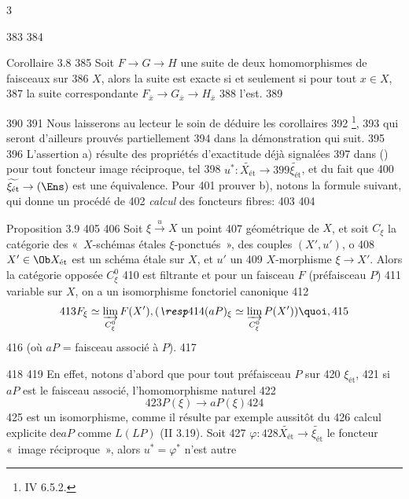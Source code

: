 3	\documentclass[10pt]{../fichiers-configuration-latex/smfart}
\begin{document}
   383	
   384	\begin{enonce*}{Corollaire 3.8}
   385	Soit $F \to G \to H$ une suite de deux homomorphismes de faisceaux sur
   386	$X$, alors la suite est exacte si et seulement si pour tout $x \in X$,
   387	la suite correspondante $F_{\bar{x}} \to G_{\bar{x}} \to H_{\bar{x}}$
   388	l'est.
   389	\end{enonce*}
   390	
   391	Nous laisserons au lecteur le soin de déduire les corollaires
   392	\footnote{\Cf IV 6.5.2.}, %
   393	qui seront d'ailleurs prouvés partiellement
   394	dans la démonstration qui suit.
   395	
   396	L'assertion a) résulte des propriétés d'exactitude déjà signalées
   397	dans () pour tout foncteur image réciproque, tel
   398	$u^{\ast} : \widetilde{X_{\text{ét}}} \to
   399	\widetilde{\xi_{\text{ét}}}$, et du fait que
   400	$\widetilde{\xi_{\text{ét}}} \to (\Ens)$ est une équivalence. Pour
   401	prouver b), notons la formule suivant, qui donne un procédé de
   402	\emph{calcul} des foncteurs fibres:
   403	
   404	\begin{enonce*}{Proposition 3.9\footnotemark}
   405	 %
   406	Soit $\xi \xrightarrow{u} X$ un point
   407	géométrique de $X$, et soit $C_{\xi}$ la catégorie des « $X$-schémas étales $\xi$-ponctués », \ie des couples $(X', u')$, o
   408	$X'\in \Ob X_{\text{\rm ét}}$ est un schéma étale sur $X$, et $u'$ un
   409	$X$-morphisme $\xi \to X'$. Alors la catégorie opposée $C^{0}_{\xi}$
   410	est filtrante et pour un faisceau $F$ (\resp préfaisceau $P$)
   411	variable sur $X$, on a un isomorphisme fonctoriel canonique
   412	$$
   413	F_{\xi} \simeq \varinjlim_{C^{0}_{\xi}} F(X'), (\emph{\resp}
   414	(aP)_{\xi} \simeq \varinjlim_{C^{0}_{\xi}} P(X')){\quoi},
   415	$$
   416	(où $aP$ = faisceau associé à $P$).
   417	\end{enonce*}
   418	
   419	En effet, notons d'abord que pour tout préfaisceau $P$ sur
   420	$\xi_{\text{ét}}$,
   421	si $aP$ est le faisceau associé, l'homomorphisme naturel
   422	$$
   423	P(\xi) \to aP(\xi)
   424	$$
   425	est un isomorphisme, comme il résulte par exemple aussitôt du
   426	calcul explicite de\pageoriginale  $aP$ comme $L(LP)$ (II 3.19). Soit
   427	$\varphi :
   428	\widetilde{X_{\text{ét}}} \to \widetilde{\xi_{\text{ét}}}$ le foncteur « image réciproque », alors $u^{\ast} = \varphi^{\ast}$ n'est autre
\end{document}

